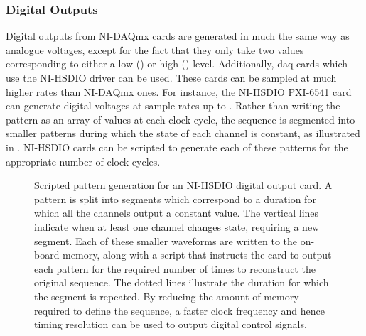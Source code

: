 \subsubsection{Digital Outputs} 
Digital outputs from NI-DAQmx cards are generated in much the same way as
analogue voltages, except for the fact that they only take two values
corresponding to either a low () or high
() level. Additionally, \ac{daq} cards which use the
NI-HSDIO driver can be used. These cards can be sampled at much higher rates than NI-DAQmx ones. For instance, the NI-HSDIO PXI-6541 card can generate
digital voltages at sample rates up to . Rather than writing the pattern as an array of
values at each clock cycle, the sequence is segmented into smaller patterns
during which the state of each channel is constant, as illustrated in
. NI-HSDIO cards can be scripted to generate each
of these patterns for the appropriate number of clock cycles.
\begin{figure}[!htbp]
    \centering
    
    \caption[Scripted pattern generation for an NI-HSDIO card]{Scripted
    pattern generation for an NI-HSDIO digital output card. A pattern is
    split into segments which correspond to a duration for which all the
    channels output a constant value. The vertical lines indicate when
    at least one channel changes state, requiring a new segment. Each of these smaller waveforms are
    written to the on-board memory, along with a script that instructs the
    card to output each pattern for the required number of times to
    reconstruct the original sequence. The dotted lines illustrate the
    duration for which the segment is repeated. By reducing the amount of memory
    required to define the sequence, a faster clock frequency and hence
    timing resolution can be used to output digital control
    signals.}\label{fig:hsdio_timing}
\end{figure}
